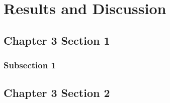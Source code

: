 \chapter{Results and Discussion}
\section{Chapter 3 Section 1}
\subsection{Subsection 1}
\section{Chapter 3 Section 2}